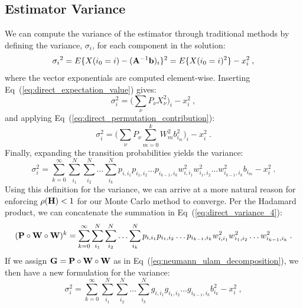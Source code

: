 \subsection{Estimator Variance}
\label{subsec:estimator_variance}
We can compute the variance of the estimator through traditional
methods by defining the variance, $\sigma_i$, for each component in
the solution:
\begin{equation}
  {\sigma_i}^2 = E\{X(i_0 = i) - (\mathbf{A}^{-1}\mathbf{b})_i\}^2 = E\{X(i_0
  = i)^2\} - x_i^2\:,
  \label{eq:direct_variance_1}
\end{equation}
where the vector exponentials are computed element-wise. Inserting
Eq~(\ref{eq:direct_expectation_value}) gives:
\begin{equation}
  \sigma_i^2 = \Big(\sum_{\nu} P_{\nu} X_{\nu}^2\Big)_i - x_i^2\:,
  \label{eq:direct_variance_2}
\end{equation}
and applying Eq~(\ref{eq:direct_permutation_contribution}):
\begin{equation}
  \sigma_i^2 = \Big(\sum_{\nu} P_{\nu} \sum_{m=0}^k W_{m}^2
  b_{i_m}^2\Big)_i - x_i^2\:.
  \label{eq:direct_variance_3}
\end{equation}
Finally, expanding the transition probabilities yields the variance:
\begin{equation}
  \sigma_i^2 = \sum_{k=0}^{\infty}\sum_{i_1}^{N}\sum_{i_2}^{N}\ldots
  \sum_{i_k}^{N} p_{i,i_1}p_{i_1,i_2}\ldots p_{i_{k-1},i_k}
  w^2_{i,i_1}w^2_{i_1,i_2}\ldots w^2_{i_{k-1},i_k} b_{i_m} - x_i^2\:.
  \label{eq:direct_variance_4}
\end{equation}
Using this definition for the variance, we can arrive at a more natural
reason for enforcing $\rho(\mathbf{H}) < 1$ for our Monte Carlo method to
converge. Per the Hadamard product, we can concatenate the summation
in Eq~(\ref{eq:direct_variance_4}):
\begin{equation}
  (\mathbf{P} \circ \mathbf{W} \circ \mathbf{W})^k =
  \sum_{k=0}^{\infty}\sum_{i_1}^{N}\sum_{i_2}^{N}\ldots \sum_{i_k}^{N}
  p_{i,i_1}p_{i_1,i_2}\ldots p_{i_{k-1},i_k}
  w^2_{i,i_1}w^2_{i_1,i_2}\ldots w^2_{i_{k-1},i_k}\:.
  \label{eq:double_weighted_decomposition}
\end{equation}
If we assign $\mathbf{G} = \mathbf{P} \circ \mathbf{W} \circ \mathbf{W}$ as in
Eq~(\ref{eq:neumann_ulam_decomposition}), we then have a new
formulation for the variance:
\begin{equation}
  \sigma^2_i = \sum_{k=0}^{\infty}\sum_{i_1}^{N}\sum_{i_2}^{N}\ldots
  \sum_{i_k}^{N}g_{i,i_1}g_{i_1,i_2}\ldots g_{i_{k-1},i_k} b_{i_k}^2 -
  x_i^2\:,
\end{equation}
